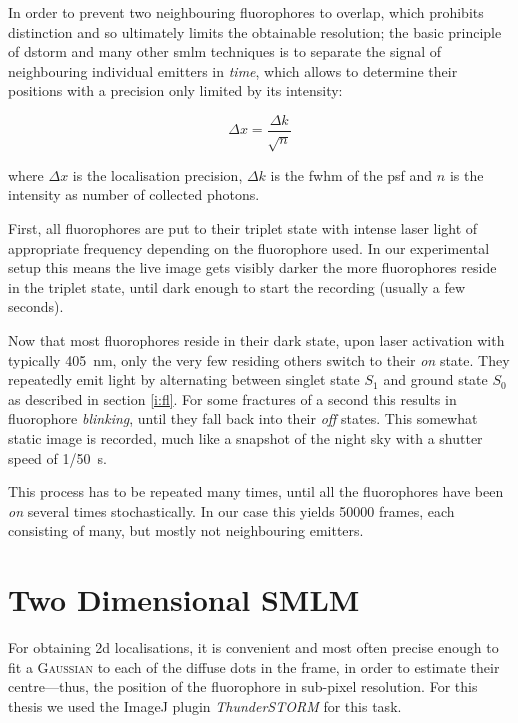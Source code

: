 \documentclass[11pt, a4paper, oneside, twocolumn]{report}
\newcommand{\e}{\emph}
\newcommand{\x}[1]{#1\index{#1}}
\begin{document}
In order to prevent two neighbouring fluorophores to overlap, which
prohibits distinction and so ultimately limits the obtainable
resolution; the basic principle of \gls{dstorm} and many other
\gls{smlm} techniques is to separate the signal of neighbouring
individual emitters in \e{time}, which allows to determine their
positions with a precision only limited by its intensity:

\begin{equation}
  \Delta x = \frac{ \Delta k }{ \sqrt{n} }
\end{equation}

where $\Delta x$ is the localisation precision, $\Delta k$ is the
\gls{fwhm} of the \gls{psf} and $n$ is the intensity as number of
collected photons.

First, all fluorophores are put to their triplet state with intense
laser light of appropriate frequency depending on the fluorophore
used. In our experimental setup this means the live image gets visibly
darker the more fluorophores reside in the triplet state, until dark
enough to start the recording (usually a few seconds).

Now that most fluorophores reside in their dark state, upon laser
activation with typically \SI{405}{\nm}, only the very few residing
others switch to their \e{on} state. They repeatedly emit light by
alternating between singlet state $S_1$ and ground state $S_0$ as
described in section \ref{i:fl}. For some fractures of a second this
results in fluorophore \e{blinking}, until they fall back into their
\e{off} states. This somewhat static image is recorded, much like a
snapshot of the night sky with a shutter speed of 1/50~s.

This process has to be repeated many times, until all the fluorophores
have been \e{on} several times stochastically. In our case this yields
50000 frames, each consisting of many, but mostly not neighbouring
emitters.


\section{Two Dimensional SMLM}

For obtaining 2d localisations, it is convenient and most often
precise enough to fit a \textsc{\x{Gaussian}} to each of the diffuse
dots in the frame, in order to estimate their centre---thus, the
position of the fluorophore in sub-pixel resolution. For this thesis
we used the ImageJ plugin \e{ThunderSTORM} \cite{omk14} for this task.
\end{document}

